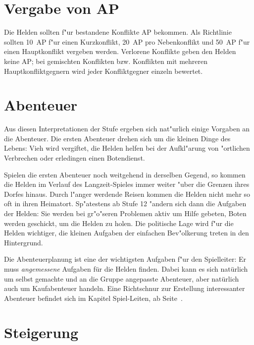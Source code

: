 \section{Vergabe von AP}
Die Helden sollten f"ur bestandene Konflikte AP bekommen. 
Als Richtlinie sollten 10~AP f"ur einen Kurzkonflikt, 20~AP pro Nebenkonflikt und 50~AP f"ur einen Hauptkonflikt vergeben werden.
Verlorene Konflikte geben den Helden keine AP; bei gemischten Konflikten bzw. Konflikten mit mehreren Hauptkonfliktgegnern wird jeder Konfliktgegner einzeln bewertet.

\section{Abenteuer}
Aus diesen Interpretationen der Stufe ergeben sich nat"urlich einige Vorgaben an die Abenteuer. Die ersten Abenteuer drehen sich um die kleinen Dinge des Lebens: Vieh wird vergiftet, die Helden helfen bei der Aufkl"arung von "ortlichen Verbrechen oder erledingen einen Botendienst.

Spielen die ersten Abenteuer noch weitgehend in derselben Gegend, so kommen die Helden im Verlauf des Langzeit-Spieles immer weiter "uber die Grenzen ihres Dorfes hinaus. Durch l"anger werdende Reisen kommen die Helden nicht mehr so oft in ihren Heimatort. Sp"atestens ab Stufe 12 "andern sich dann die Aufgaben der Helden: Sie werden bei gr"o"seren Problemen aktiv um Hilfe gebeten, Boten werden geschickt, um die Helden zu holen. Die politische Lage wird f"ur die Helden wichtiger, die kleinen Aufgaben der einfachen Bev"olkerung treten in den Hintergrund.

Die Abenteuerplanung ist eine der wichtigsten Aufgaben f"ur den Spielleiter: Er muss \emph{angemessene} Aufgaben für die Helden finden. Dabei kann es sich natürlich um selbst gemachte und an die Gruppe angepasste Abenteuer, aber natürlich auch um Kaufabenteuer handeln. Eine Richtschnur zur Erstellung interessanter Abenteuer befindet sich im Kapitel Spiel-Leiten, ab Seite~\pageref{Ch:Spielleiten}.


\section{Steigerung}\label{Steigerungstabelle}\label{Steigerung}

